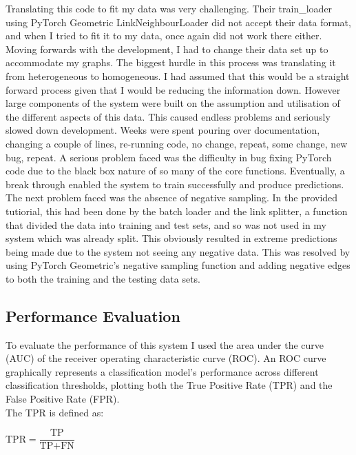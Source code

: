 \documentclass{l4proj}
\begin{document}
Translating this code to fit my data was very challenging. Their train\_loader using PyTorch Geometric LinkNeighbourLoader did not accept their data format, and when I tried to fit it to my data, once again did not work there either. Moving forwards with the development, I had to change their data set up to accommodate my graphs. The biggest hurdle in this process was translating it from heterogeneous to homogeneous. I had assumed that this would be a straight forward process given that I would be reducing the information down. However large components of the system were built on the assumption and utilisation of the different aspects of this data. This caused endless problems and seriously slowed down development. Weeks were spent pouring over documentation, changing a couple of lines, re-running code, no change, repeat, some change, new bug, repeat. A serious problem faced was the difficulty in bug fixing PyTorch code due to the black box nature of so many of the core functions. Eventually, a break through enabled the system to train successfully and produce predictions. \\

The next problem faced was the absence of negative sampling. In the provided tutiorial, this had been done by the batch loader and the link splitter, a function that divided the data into training and test sets, and so was not used in my system which was already split. This obviously resulted in extreme predictions being made due to the system not seeing any negative data. This was resolved by using PyTorch Geometric's negative sampling function and adding negative edges to both the training and the testing data sets. \\

\subsection{Performance Evaluation}

To evaluate the performance of this system I used the area under the curve (AUC) of the receiver operating characteristic curve (ROC). An ROC curve graphically represents a classification model's performance across different classification thresholds, plotting both the True Positive Rate (TPR) and the False Positive Rate (FPR). \\

The TPR is defined as: 

\begin{center}
    $\text{TPR} = \dfrac{\text{TP}}{\text{TP} + \text{FN}}$ \\
\end{center}
\end{document}
